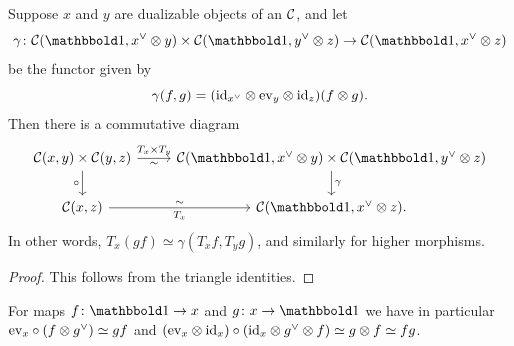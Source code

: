 \documentclass[a4paper,11pt]{article}
\begin{document}
\begin{lemma}\label{lem:dual comp eq}
  Suppose $x$ and $y$ are dualizable objects of an \incat{}
  $\mathcal{C}$, and let \[\gamma \colon \nC(\bbone,x^{\vee} \otimes y) \times \nC(\bbone, y^{\vee}
    \otimes z) \to \nC(\bbone, x^{\vee} \otimes z)\]
  be the functor given by
  \[
    \gamma(f,g) = (\text{\textup{id}}_{x^{\vee}} \otimes \text{\textup{ev}}_{y} \otimes \text{\textup{id}}_{z})(f
    \otimes g). \]Then there is a commutative diagram
  \[
    \begin{tikzcd}
      \nC(x,y) \times \nC(y,z) \ar[r, "T_{x} \times T_{y}", "\sim"'] \ar[d, "\circ"'] &
     \nC(\bbone,x^{\vee} \otimes y) \times \nC(\bbone, y^{\vee}
     \otimes z)  \ar[d, "\gamma"] \\
     \nC(x,z) \ar[r, "T_{x}"', "\sim"] & \nC(\bbone,x^{\vee}\otimes z).
    \end{tikzcd}
  \]
  In other words, $T_{x}(gf) \simeq \gamma(T_{x}f, T_{y}g)$, and
  similarly for higher morphisms.
\end{lemma}
\begin{proof}
  This follows from the triangle identities.
\end{proof}

\begin{observation}\label{obs:dual maps comp}
  For maps $f \colon \bbone \to x$ and $g
  \colon x \to \bbone$ we have in particular $\text{\textup{ev}}_{x} \circ (f \otimes g^{\vee})
  \simeq gf$ and $(\text{\textup{ev}}_{x} \otimes \text{\textup{id}}_{x}) \circ (\text{\textup{id}}_{x} \otimes g^{\vee}
  \otimes f) \simeq g \otimes f \simeq fg$. 
\end{observation}
\end{document}
